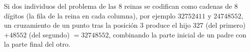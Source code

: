 \begin{example}
    Si dos individuos del problema de las 8 reinas se codifican como cadenas de 8 dígitos (la fila de la reina en
    cada columna), por ejemplo $32752411$ y $24748552$, un cruzamiento de un punto tras la posición 3 produce el hijo
    $327$ (del primero) $+48552$ (del segundo) $= 32748552$, combinando la parte inicial de un padre con la parte
    final del otro.
\end{example}

